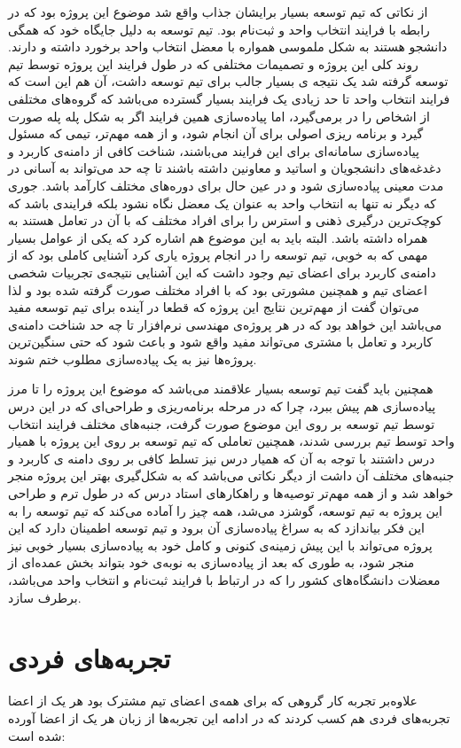 \documentclass{report}
\begin{document}
از نکاتی که تیم توسعه بسیار برایشان جذاب واقع شد موضوع این پروژه بود که در رابطه با فرایند انتخاب واحد و ثبت‌نام بود. تیم توسعه به دلیل جایگاه خود که همگی دانشجو هستند به شکل ملموسی همواره با معضل انتخاب واحد برخورد داشته و دارند. روند کلی این پروژه و تصمیمات مختلفی که در طول فرایند این پروژه توسط تیم توسعه گرفته شد یک نتیجه ی بسیار جالب برای تیم توسعه داشت، آن هم این است که‌ فرایند انتخاب واحد تا حد زیادی یک فرایند بسیار گسترده می‌باشد که گروه‌های مختلفی از اشخاص را در برمی‌گیرد‌، اما پیاده‌سازی همین فرایند اگر به شکل پله پله صورت گیرد و برنامه ریزی اصولی برای آن انجام شود، و از همه مهم‌تر، تیمی که مسئول پیاده‌سازی سامانه‌ای برای این فرایند می‌باشند، شناخت کافی از دامنه‌ی کاربرد و دغدغه‌های دانشجویان و اساتید و معاونین داشته باشند تا چه حد می‌تواند به آسانی در مدت معینی پیاده‌سازی شود و در عین حال برای دوره‌های مختلف کارآمد باشد. جوری که دیگر نه تنها به انتخاب واحد به عنوان یک معضل نگاه نشود بلکه فرایندی باشد که کوچک‌ترین درگیری ذهنی و استرس را برای افراد مختلف که با آن در تعامل هستند به همراه داشته باشد. البته باید به این موضوع هم اشاره کرد که یکی از عوامل بسیار مهمی که به خوبی، تیم توسعه را در انجام پروژه یاری کرد آشنایی کاملی بود که از دامنه‌ی کاربرد برای اعضای تیم وجود داشت که این آشنایی نتیجه‌ی تجربیات شخصی اعضای تیم و همچنین مشورتی بود که با افراد مختلف صورت گرفته شده بود و لذا می‌توان گفت از مهم‌ترین نتایج این پروژه که قطعا در آینده برای تیم توسعه مفید می‌باشد این خواهد بود که در هر پروژه‌ی مهندسی نرم‌افزار تا چه حد شناخت دامنه‌ی کاربرد و تعامل با مشتری می‌تواند مفید واقع شود و باعث شود که حتی سنگین‌ترین پروژه‌ها نیز به یک پیاده‌سازی مطلوب ختم شوند.


همچنین باید گفت تیم توسعه بسیار علاقمند می‌باشد که موضوع این پروژه را تا مرز پیاده‌سازی هم پیش ببرد، چرا که در مرحله برنامه‌ریزی و طراحی‌ای که در این درس توسط تیم توسعه بر روی این موضوع صورت گرفت، جنبه‌های مختلف فرایند انتخاب واحد توسط تیم بررسی شدند، همچنین تعاملی که تیم توسعه بر روی این پروژه با همیار درس داشتند با توجه به آن که همیار درس نیز تسلط کافی بر روی دامنه ی کاربرد و جنبه‌های مختلف آن داشت از دیگر نکاتی می‌باشد که به شکل‌گیری بهتر این پروژه منجر خواهد شد و از همه مهم‌تر توصیه‌ها و راهکارهای استاد درس که در طول ترم و طراحی این پروژه به تیم توسعه، گوشزد می‌شد، همه چیز را آماده می‌کند که تیم توسعه را به این فکر بیاندازد که به سراغ پیاده‌سازی آن برود و تیم توسعه اطمینان دارد که این پروژه می‌تواند با این پیش زمینه‌ی کنونی و کامل خود به پیاده‌سازی بسیار خوبی نیز منجر شود، به طوری که بعد از پیاد‌ه‌سازی به نوبه‌ی خود بتواند بخش عمده‌ای از معضلات دانشگاه‌های کشور را که در ارتباط با فرایند ثبت‌نام و انتخاب واحد می‌باشد، برطرف سازد.
\section{تجربه‌های فردی}
علاوه‌بر تجربه کار گروهی که برای همه‌ی اعضای تیم مشترک بود هر یک از اعضا تجربه‌های فردی هم کسب کردند که در ادامه این تجربه‌ها از زبان هر یک از اعضا آورده شده است:
\end{document}
